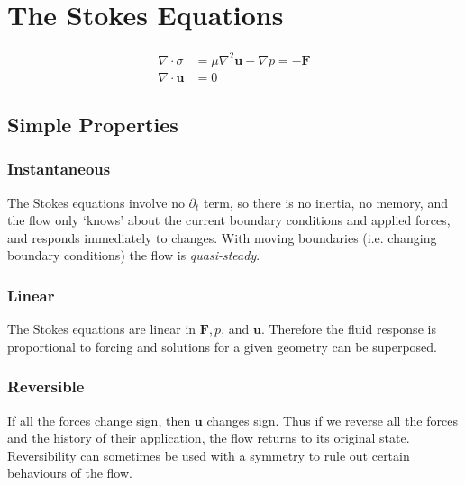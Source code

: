 \documentclass{jknotes}
\begin{document}
\section{The Stokes Equations}
\begin{equation}
	\begin{aligned}
		\nabla \cdot \sigma &= \mu \nabla^2 \bm{u} - \nabla p = - \bm{F} \\
		\nabla \cdot \bm{u} &= 0
	\end{aligned}
\end{equation}

\subsection{Simple Properties}
\subsubsection{Instantaneous}
The Stokes equations involve no $\partial_t$ term, so there is no inertia, no
memory, and the flow only `knows' about the current boundary conditions and
applied forces, and responds immediately to changes. With moving boundaries
(i.e. changing boundary conditions) the flow is \emph{quasi-steady}.

\subsubsection{Linear}
The Stokes equations are linear in $\bm{F}, p$, and $\bm{u}$. Therefore the
fluid response is proportional to forcing and solutions for a given geometry
can be superposed.

\subsubsection{Reversible}
If all the forces change sign, then $\bm{u}$ changes sign. Thus if we reverse
all the forces and the history of their application, the flow returns to its
original state. Reversibility can sometimes be used with a symmetry to rule
out certain behaviours of the flow.
\end{document}
